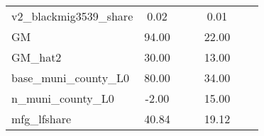 \begin{table}[htbp]
\begin{tabular}{l*{2}{ccc}}
v2\_blackmig3539\_share&        0.02&            &            &        0.01&            &            \\
GM                  &       94.00&            &            &       22.00&            &            \\
GM\_hat2             &       30.00&            &            &       13.00&            &            \\
base\_muni\_county\_L0 &       80.00&            &            &       34.00&            &            \\
n\_muni\_county\_L0    &       -2.00&            &            &       15.00&            &            \\
mfg\_lfshare         &       40.84&            &            &       19.12&            &            \\
\bottomrule
\end{tabular}
\end{table}
